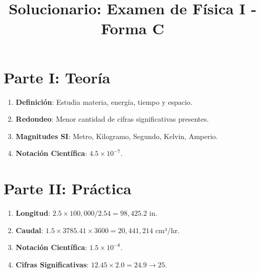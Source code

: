 \documentclass[a4paper,12pt]{article}
\title{Solucionario: Examen de Física I - Forma C}
\date{}
\begin{document}
\maketitle

\section{Parte I: Teoría}
\begin{enumerate}
    \item \textbf{Definición}: Estudia materia, energía, tiempo y espacio.
    \item \textbf{Redondeo}: Menor cantidad de cifras significativas presentes.
    \item \textbf{Magnitudes SI}: Metro, Kilogramo, Segundo, Kelvin, Amperio.
    \item \textbf{Notación Científica}: $4.5 \times 10^{-7}$.
\end{enumerate}

\section{Parte II: Práctica}
\begin{enumerate}
    \item \textbf{Longitud}: $2.5 \times 100,000 / 2.54 = 98,425.2$ in.
    \item \textbf{Caudal}: $1.5 \times 3785.41 \times 3600 = 20,441,214$ cm³/hr.
    \item \textbf{Notación Científica}: $1.5 \times 10^{-8}$.
    \item \textbf{Cifras Significativas}: $12.45 \times 2.0 = 24.9 \rightarrow 25$.
\end{enumerate}
\end{document}
